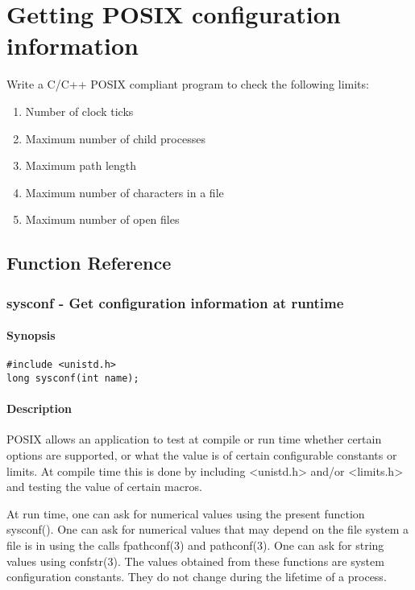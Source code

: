 \chapter{Getting POSIX configuration information}

Write a C/C++ POSIX compliant program to check the following limits:
\begin{enumerate}
	\item Number of clock ticks
	\item Maximum number of child processes
	\item Maximum path length
	\item Maximum number of characters in a file
	\item Maximum number of open files
\end{enumerate}

\section{Function Reference}

\subsection{sysconf - Get configuration information at runtime}

\subsubsection{Synopsis}

\begin{lstlisting}
#include <unistd.h>
long sysconf(int name);
\end{lstlisting}

\subsubsection{Description}

POSIX allows an application to test at compile or run time whether certain options are supported, or what the value is of certain configurable constants or limits. At compile time this is done by including <unistd.h> and/or <limits.h> and testing the value of certain macros.

At run time, one can ask for numerical values using the present function sysconf(). One can ask for numerical values that may depend on the file system a file is in using the calls fpathconf(3) and pathconf(3). One can ask for string values using confstr(3). The values obtained from these functions are system configuration constants. They do not change during the lifetime of a process.

